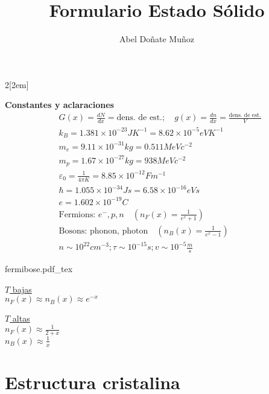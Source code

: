 \documentclass[leqno]{article}
\title{Formulario Estado Sólido}
\author{Abel Doñate Muñoz}
\date{}
\newcommand{\incfig}[1]{%
\begin{center}
\def\svgwidth{0.9\columnwidth}
{#1.pdf_tex}
\end{center}
}
\begin{document}
\begin{multicols}{2}[\columnsep2em]

\textbf{Constantes y aclaraciones}
\begin{align*}
& G(x) = \frac{dN}{dx} = \text{dens. de est.}; \quad g(x)= \frac{dn}{dx} = \frac{\text{dens. de est.}}{V}\\
&k_B = 1.381\times 10^{-23}JK^{-1} = 8.62\times 10^{-5}eVK^{-1}\\
&m_e = 9.11\times 10^{-31}kg = 0.511MeVc^{-2}\\
&m_p = 1.67\times 10^{-27}kg = 938MeVc^{-2}\\
&\varepsilon _0 = \frac{1}{4\pi K} = 8.85\times 10^{-12} Fm^{-1}\\
&\hbar = 1.055\times 10^{-34} Js = 6.58\times 10^{-16}eVs \\
&e = 1.602 \times 10^{-19} C\\
&\text{Fermions: }e^-, p, n \quad (n_F(x) = \frac{1}{e ^{x}+1})\\
& \text{Bosons: phonon, photon} \quad (n_B(x)=\frac{1}{e ^{x} -1})\\
& n\sim 10 ^{22}cm ^{-3}; \tau \sim 10 ^{-15}s; v\sim 10 ^{-5}\frac{m}{s}
\end{align*}
\begin{minipage}{0.5\columnwidth}
\incfig{fermibose}
\end{minipage}
\begin{minipage}{0.7\columnwidth}
  \underline{$T$ bajas}\\
 $n_F(x) \approx n_B(x)\approx e ^{-x}$

  \underline{$T$ altas}\\
 $n_F(x) \approx \frac{1}{2+x}$ \\
 $n_B(x) \approx \frac{1}{x}$

\end{minipage}


\section{Estructura cristalina}

\end{multicols}
\end{document}
